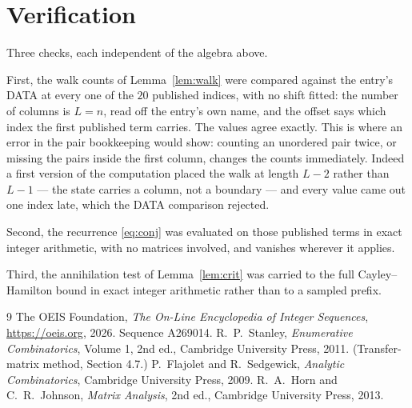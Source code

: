 \documentclass[11pt,a4paper]{article}
\theoremstyle{plain}
\theoremstyle{definition}
\begin{document}
\section{Verification}

Three checks, each independent of the algebra above.

First, the walk counts of Lemma~\ref{lem:walk} were compared against the entry's DATA at
every one of the $20$ published indices, with no shift fitted: the number of columns is
$L=n$, read off the entry's own name, and the offset says which index the first
published term carries. The values agree exactly. This is where an error in the pair
bookkeeping would show: counting an unordered pair twice, or missing the pairs inside the
first column, changes the counts immediately. Indeed a first version of the computation
placed the walk at length $L-2$ rather than $L-1$ --- the state carries a column, not a
boundary --- and every value came out one index late, which the DATA comparison rejected.

Second, the recurrence \eqref{eq:conj} was evaluated on those published terms in exact
integer arithmetic, with no matrices involved, and vanishes wherever it applies.

Third, the annihilation test of Lemma~\ref{lem:crit} was carried to the full
Cayley--Hamilton bound in exact integer arithmetic rather than to a sampled prefix.

\begin{thebibliography}{9}
 The OEIS Foundation, \emph{The On-Line Encyclopedia of Integer
Sequences}, \url{https://oeis.org}, 2026. Sequence A269014.
 R.~P.~Stanley, \emph{Enumerative Combinatorics}, Volume 1, 2nd ed.,
Cambridge University Press, 2011. (Transfer-matrix method, Section 4.7.)
 P.~Flajolet and R.~Sedgewick, \emph{Analytic Combinatorics}, Cambridge
University Press, 2009.
 R.~A.~Horn and C.~R.~Johnson, \emph{Matrix Analysis}, 2nd ed., Cambridge
University Press, 2013.
\end{thebibliography}
\end{document}
